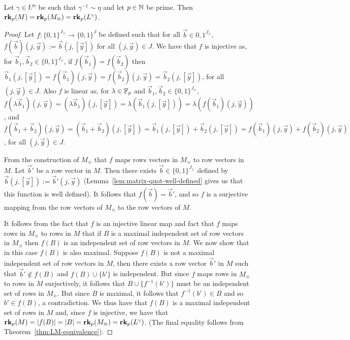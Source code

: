 \documentclass[../paper.tex]{subfiles}
\begin{document}
\begin{lem}
	Let $\gamma \in U^{\underline{n}}$ be such that $\gamma^{-1} \sim \eta$ and
  let $p \in \mathbb{N}$ be prime. Then $\text{\textbf{rk}}_p (M) = \text{\textbf{rk}}_p (M_\equiv) = \text{\textbf{rk}}_p
  (L^{\gamma})$.
  \label{lem:rank-triple-equivilence}
\end{lem}
\begin{proof}
	Let $f : \{0,1\}^{J_\equiv} \rightarrow \{0,1\}^{J}$ be defined such that for
  all $\vec{b} \in {0,1}^{J_\equiv}$, $f(\vec{b}) (j, \vec{y}) := \vec{b}(j,
  [\vec{y}])$ for all $(j, \vec{y}) \in J$. We have that $f$ is injective as,
  for $\vec{b}_1, \vec{b}_2 \in \{0,1\}^{J_\equiv}$, if $f(\vec{b}_1) =
  f(\vec{b}_2)$ then $\vec{b}_1 (j, [\vec{y}]) = f(\vec{b}_1)(j, \vec{y}) =
  f(\vec{b}_2)(j, \vec{y}) = \vec{b}_2(j, [\vec{y}])$, for all $(j, \vec{y}) \in
  J$. Also $f$ is linear as, for $\lambda \in \mathbb{F}_p$ and $\vec{b}_1, \vec{b}_2
  \in \{0,1\}^{J_\equiv}$, $f(\lambda \vec{b}_1) (j, \vec{y}) = (\lambda
  \vec{b}_1)(j, [\vec{y}]) = \lambda (\vec{b}_1 (j, [\vec{y}])) = \lambda (f(
  \vec{b}_1) (j, \vec{y}))$, and $ f(\vec{b}_1 + \vec{b}_2) (j, \vec{y}) =
  (\vec{b}_1 + \vec{b}_2) (j, [\vec{y}]) = \vec{b}_1(j, [\vec{y}]) +
  \vec{b}_2(j, [\vec{y}]) = f(\vec{b}_1)(j, \vec{y}) + f(\vec{b}_2)(j,
  \vec{y})$, for all $(j, \vec{y}) \in J$.
		
	From the construction of $M_\equiv$ that $f$ maps rows vectors in $M_\equiv$
  to row vectors in $M$. Let $\vec{b}'$ be a row vector in $M$. Then there
  exists $\vec{b} \in \{0,1\}^{J_\equiv}$ defined by $\vec{b} (j, [\vec{y}]) :=
  \vec{b}' (j, \vec{y})$ (Lemma~\ref{lem:matrix-quot-well-defined} gives us that
  this function is well defined). It follows that $f(\vec{b}) = \vec{b}'$, and
  so $f$ is a surjective mapping from the row vectors of $M_\equiv$ to the row
  vectors of $M$.
		
	It follows from the fact that $f$ is an injective linear map and fact that $f$
  maps rows in $M_\equiv$ to rows in $M$ that if $B$ is a maximal independent
  set of row vectors in $M_\equiv$ then $f(B)$ is an independent set of row
  vectors in $M$. We now show that in this case $f(B)$ is also maximal. Suppose
  $f(B)$ is not a maximal independent set of row vectors in $M$, then there
  exists a row vector $\vec{b}'$ in $M$ such that $\vec{b}' \notin f(B)$ and
  $f(B) \cup \{b'\}$ is independent. But since $f$ maps rows in $M_\equiv$ to
  rows in $M$ surjectively, it follows that $B \cup \{f^{-1}(b') \}$ must be an
  independent set of rows in $M_\equiv$. But since $B$ is maximal, it follows
  that $f^{-1}(b') \in B$ and so $b' \in f(B)$, a contradiction. We thus have
  that $f(B)$ is a maximal independent set of rows in $M$ and, since $f$ is
  injective, we have that $\text{\textbf{rk}}_p (M) = \vert f(B) \vert = \vert B \vert =
  \text{\textbf{rk}}_p (M_\equiv) = \text{\textbf{rk}}_p(L^{\gamma})$. (The final equality follows from
  Theorem~\ref{thm:LM-equivalence}).
\end{proof}
\end{document}
